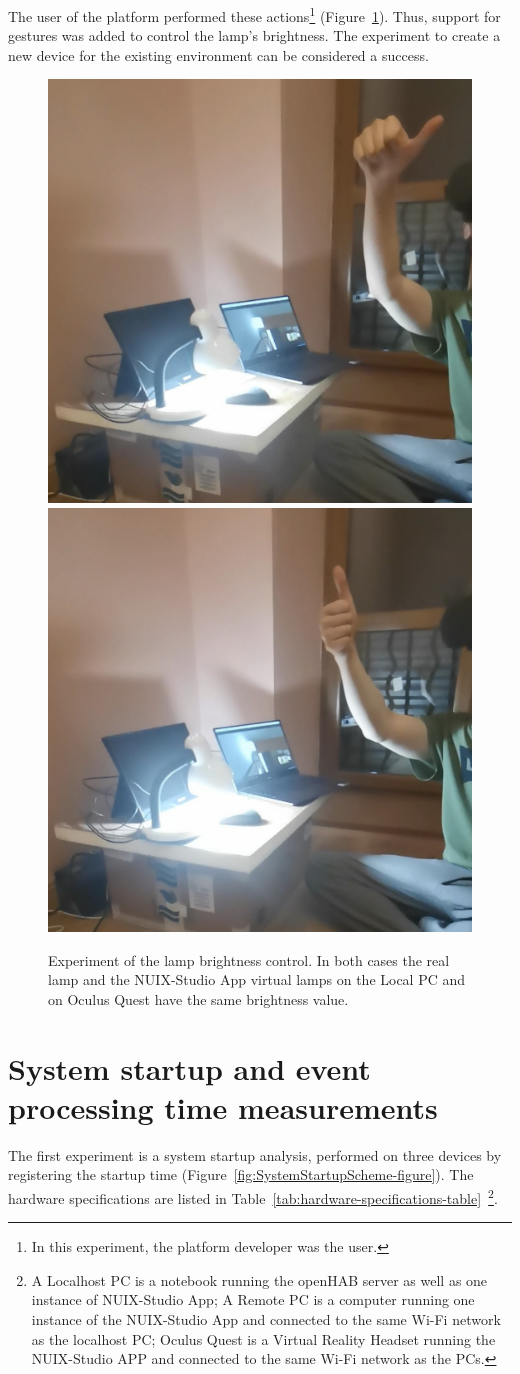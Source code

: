 The user of the platform performed these actions\footnote{In this experiment, the platform developer was the user.} (Figure~\ref{fig:BrightnessControl-figure}). Thus, support for gestures was added to control the lamp's brightness. The experiment to create a new device for the existing environment can be considered a success.

\begin{figure}
  \centering
    {\includegraphics[width=0.45\linewidth]{figures/HalflBrightness.jpg}}
    {\includegraphics[width=0.45\linewidth]{figures/FullBrightness.jpg}}
  \caption{Experiment of the lamp brightness control. In both cases the real lamp and the NUIX-Studio App virtual lamps on the Local PC and on Oculus Quest have the same brightness value.}
  \label{fig:BrightnessControl-figure}
\end{figure}

\section{System startup and event processing time measurements}

The first experiment is a system startup analysis, performed on three devices by registering the startup time (Figure~\ref{fig:SystemStartupScheme-figure}). The hardware specifications are listed in Table~\ref{tab:hardware-specifications-table}~\footnote{A Localhost PC is a notebook running the openHAB server as well as one instance of NUIX-Studio App; A Remote PC is a computer running one instance of the NUIX-Studio App and connected to the same Wi-Fi network as the localhost PC; Oculus Quest is a Virtual Reality Headset running the NUIX-Studio APP and connected to the same Wi-Fi network as the PCs.}.

